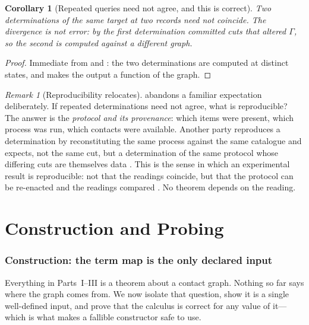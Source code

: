 \documentclass[11pt,twocolumn,a4paper]{article}
\theoremstyle{dirthm}
\newtheorem{corollary}[theorem]{Corollary}
\theoremstyle{definition}
\theoremstyle{remark}
\newtheorem{remark}[theorem]{Remark}
\newcommand{\Gph}{\Gamma}
\begin{document}
\begin{corollary}[Repeated queries need not agree, and this is correct]
\label{cor:repeat}
Two determinations of the same target at two records need not coincide. The
divergence is not error: by  the first determination
committed cuts that altered $\Gph$, so the second is computed against a
different graph.
\end{corollary}

\begin{proof}
Immediate from  and : the two
determinations are computed at distinct states, and  makes
the output a function of the graph.
\end{proof}

\begin{remark}[Reproducibility relocates]
\label{rem:repro}
 abandons a familiar expectation deliberately. If repeated
determinations need not agree, what is reproducible? The answer is the
\emph{protocol and its provenance}: which items were present, which process
was run, which contacts were available. Another party reproduces a
determination by reconstituting the same process against the same catalogue
and expects, not the same cut, but a determination of the same protocol whose
differing cuts are themselves data \citep{moreau2013,peng2011,sandve2013}.
This is the sense in which an experimental result is reproducible: not that
the readings coincide, but that the protocol can be re-enacted and the
readings compared \citep{openscience2015}. No theorem depends on the reading.
\end{remark}

\part{Construction and Probing}
\label{part:build}

\section{Construction: the term map is the only declared input}
\label{sec:construction}

Everything in Parts~I--III is a theorem about a contact graph. Nothing so far
says where the graph comes from. We now isolate that question, show it is a
single well-defined input, and prove that the calculus is correct for any
value of it---which is what makes a fallible constructor safe to use.
\end{document}
